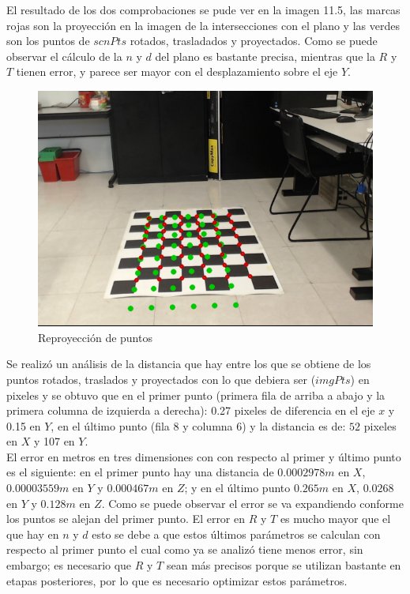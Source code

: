        	El resultado de los dos comprobaciones se pude ver en la imagen 11.5, las marcas rojas son la proyección en la imagen de la intersecciones con el plano y las verdes son los puntos de $scnPts$ rotados, trasladados y proyectados. Como se puede observar el cálculo de la $n$ y $d$ del plano es bastante precisa, mientras que la $R$ y $T$ tienen error, y parece ser mayor con el desplazamiento sobre el eje $Y$. 
       	\begin{figure}[htbp]
       		\centering
       		\includegraphics[width=.5\textwidth]{./pictures/rep}
       		\caption{Reproyección de puntos}\label{fig: figura}
       	\end{figure}
       	
       	Se realizó un análisis de la distancia que hay entre los que se obtiene de los puntos rotados, traslados y proyectados con lo que debiera ser ($imgPts$) en pixeles y se obtuvo que en el primer punto (primera fila de arriba a abajo y la primera columna de izquierda a derecha): 0.27 pixeles de diferencia en el eje $x$ y 0.15 en $Y$, en el último punto (fila 8 y columna 6) y la distancia es de: $52$ pixeles en $X$ y 107 en $Y$.\\
       	El error en metros en tres dimensiones con con respecto al primer y último punto es el siguiente: en el primer punto hay una distancia de $0.0002978m$ en $X$, $0.00003559m$ en $Y$ y $0.000467m$ en $Z$; y en el último punto $0.265m$ en $X$, $0.0268$ en $Y$ y $0.128m$ en $Z$. Como se puede observar el error se va expandiendo conforme los puntos se alejan del primer punto. El error en $R$ y $T$ es mucho mayor que el que hay en $n$ y $d$ esto se debe a que estos últimos parámetros se calculan con respecto al primer punto el cual como ya se analizó tiene menos error, sin embargo; es necesario que $R$ y $T$ sean más precisos porque se utilizan bastante en etapas posteriores, por lo que es necesario optimizar estos parámetros.
       	
       	
